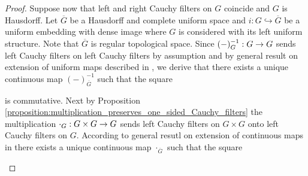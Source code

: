 \documentclass[10pt]{amsart}
\begin{document}
\begin{proof}
	Suppose now that left and right Cauchy filters on $G$ coincide and $G$ is Hausdorff. Let $\overline{G}$ be a Hausdorff and complete uniform space and $i:G\hookrightarrow \overline{G}$ be a uniform embedding with dense image where $G$ is considered with its left uniform structure. Note that $\overline{G}$ is regular topological space. Since $(-)^{-1}_G:G\rightarrow G$ sends left Cauchy filters on left Cauchy filters by assumption and by general result on extension of uniform maps described in \cite{Uniform_Spaces}, we derive that there exists a unique continuous map $(-)^{-1}_{\overline{G}}$ such that the square
	\begin{center}
	\end{center}
	is commutative. Next by Proposition \ref{proposition:multiplication_preserves_one_sided_Cauchy_filters} the multiplication $\cdot_G:G\times G \rightarrow G$ sends left Cauchy filters on $G\times G$ onto left Cauchy filters on $G$. According to general resutl on extension of continuous maps in \cite{Filters_in_topology} there exists a unique continuous map $\cdot_{\overline{G}}$ such that the square
	\begin{center}
\end{center}
\end{proof}
\end{document}
